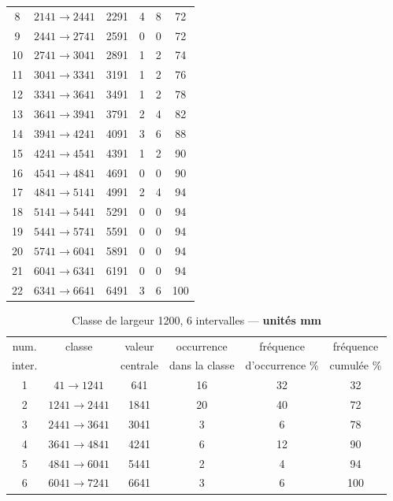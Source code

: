 \begin{enumerate}
\begin{table}[htdp]
\begin{center}
\begin{tabular}{cccccc}
 8 & $2141 \rightarrow 2441$ & 2291 & 4 &  8 &  72\\
 9 & $2441 \rightarrow 2741$ & 2591 & 0 &  0 &  72\\
10 & $2741 \rightarrow 3041$ & 2891 & 1 &  2 &  74\\
11 & $3041 \rightarrow 3341$ & 3191 & 1 &  2 &  76\\
12 & $3341 \rightarrow 3641$ & 3491 & 1 &  2 &  78\\
13 & $3641 \rightarrow 3941$ & 3791 & 2 &  4 &  82\\
14 & $3941 \rightarrow 4241$ & 4091 & 3 &  6 &  88\\
15 & $4241 \rightarrow 4541$ & 4391 & 1 &  2 &  90\\
16 & $4541 \rightarrow 4841$ & 4691 & 0 &  0 &  90\\
17 & $4841 \rightarrow 5141$ & 4991 & 2 &  4 &  94\\
18 & $5141 \rightarrow 5441$ & 5291 & 0 &  0 &  94\\
19 & $5441 \rightarrow 5741$ & 5591 & 0 &  0 &  94\\
20 & $5741 \rightarrow 6041$ & 5891 & 0 &  0 &  94\\
21 & $6041 \rightarrow 6341$ & 6191 & 0 &  0 &  94\\
22 & $6341 \rightarrow 6641$ & 6491 & 3 &  6 &  100\\
\hline
\end{tabular}
\end{center}
\label{tab:01}
\end{table}
\vspace{1.5cm}

\begin{table}[htdp]
\caption{Classe de largeur 1200, 6 intervalles --- \textbf{unités mm}}
\begin{center}
\begin{tabular}{cccccc}
\hline
num. & classe & valeur & occurrence & fréquence & fréquence\\
inter. &  & centrale & dans la classe & d'occurrence \% & cumulée \%\\\hline
 1 & $  41 \rightarrow 1241$ &  641 & 16 & 32 &  32\\
 2 & $1241 \rightarrow 2441$ & 1841 & 20 & 40 &  72\\
 3 & $2441 \rightarrow 3641$ & 3041 &  3 &  6 &  78\\
 4 & $3641 \rightarrow 4841$ & 4241 &  6 & 12 &  90\\
 5 & $4841 \rightarrow 6041$ & 5441 &  2 &  4 &  94\\
 6 & $6041 \rightarrow 7241$ & 6641 &  3 &  6 & 100\\
\hline
\end{tabular}
\end{center}
\label{tab:02}
\end{table}


\end{enumerate}

